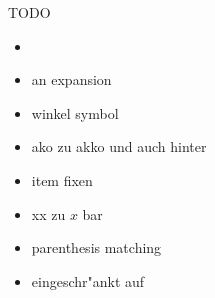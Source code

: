 \documentclass[class=article, crop=false]{standalone}
\begin{document}
\begin{zettel}{TODO}
    \begin{itemize}
        \item \R
        \item an expansion
        \item winkel symbol
        \item ako zu akko und auch hinter \
        \item item fixen
        \item xx zu $x$ bar
        \item parenthesis matching
        \item eingeschr"ankt auf
    \end{itemize}
\end{zettel}
\end{document}

